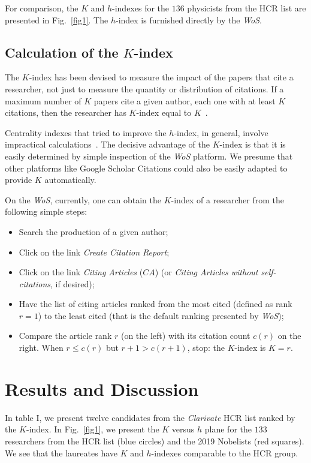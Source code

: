 \documentclass[final,3p,times]{elsarticle}
\begin{document}
For comparison, the $K$ and $h$-indexes
for the $136$ physicists from the HCR list are presented in Fig.~\ref{fig1}. The $h$-index is
furnished directly by the {\em WoS}.


\subsection{Calculation of the $K$-index}
\label{SS:2.3}

The $K$-index has been devised to measure the
impact of the papers that cite a researcher,  not just to measure the quantity or distribution of citations.  If a maximum number of
$K$ papers cite a given author, each one with at least $K$ citations, 
then the researcher has $K$-index equal to $K$~\cite{kinouchi2018,kinouchi2018k}.

Centrality indexes that tried to improve the $h$-index, in general,
involve impractical calculations~\cite{todeschini2016handbook}.  The
decisive advantage of the $K$-index is that it is easily determined by
simple inspection of the \emph{WoS} platform. We presume that other
platforms like Google Scholar Citations could also be easily adapted
to provide $K$ automatically.

On the \emph{WoS}, currently, one can obtain the $K$-index 
of a researcher from the following simple steps:
\begin{itemize}
\item Search the production of a given author;
\item Click on the link \emph{Create Citation Report};
\item Click on the link \emph{Citing Articles} ($CA$)  (or {\em Citing
  Articles without self-citations}, if desired);
\item Have the list of citing articles ranked from the most cited
  (defined as rank $r = 1$) to the least cited (that is the default
  ranking presented by \emph{WoS});
\item Compare the article rank $r$ (on the left) with
its citation count $c(r)$ on the right. When $r \leq c(r)$
but $r+1 > c(r+1)$, stop: the $K$-index is $K=r$.
\end{itemize}

\section{Results and Discussion}

In table I, we present twelve candidates from 
the {\em Clarivate} HCR list
ranked by the $K$-index.  In Fig.~\ref{fig1}, we present the $K$
versus $h$ plane for the $133$ researchers from the HCR list (blue
circles) and the 2019 Nobelists (red squares). 
We see that the laureates have $K$ and $h$-indexes comparable
to the HCR group.
\end{document}
